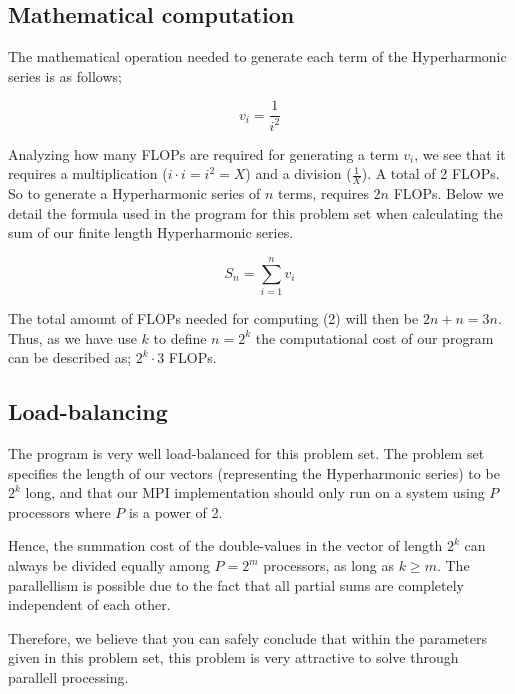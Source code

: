 \documentclass[fontsize=11pt,paper=a4,titlepage]{report}
\begin{document}
\subsection{Mathematical computation}

The mathematical operation needed to generate each term of the Hyperharmonic
series is as follows;

\begin{equation}
	v_i = \frac{1}{i^2}
\end{equation}

Analyzing how many FLOPs are required for generating a term $v_i$, we see that
it requires a multiplication ($i\cdot i = i^2 = X$) and a division
($\frac{1}{X}$). A total of 2 FLOPs. So to generate a Hyperharmonic series of
$n$ terms, requires $2n$ FLOPs. Below we detail the formula used in the program
for this problem set when calculating the sum of our finite length Hyperharmonic
series.

\begin{equation}
	S_n = \sum_{i=1}^{n} v_i
\end{equation}

The total amount of FLOPs needed for computing (2) will then be $2n + n = 3n$.
Thus, as we have use $k$ to define $n=2^k$ the computational cost of our program
can be described as; $2^k\cdot 3$ FLOPs.

\subsection{Load-balancing}

The program is very well load-balanced for this problem set. The problem set
specifies the length of our vectors (representing the Hyperharmonic series) to
be $2^k$ long, and that our MPI implementation should only run on a system using
$P$ processors where $P$ is a power of 2.

Hence, the summation cost of the double-values in the vector of length $2^k$ can
always be divided equally among $P = 2^m$ processors, as long as $k\geq m$. The
parallellism is possible due to the fact that all partial sums are completely
independent of each other. \newline


Therefore, we believe that you can safely conclude that within the parameters
given in this problem set, this problem is very attractive to solve through
parallell processing.



% 
% 
% 
% 

\end{document}

